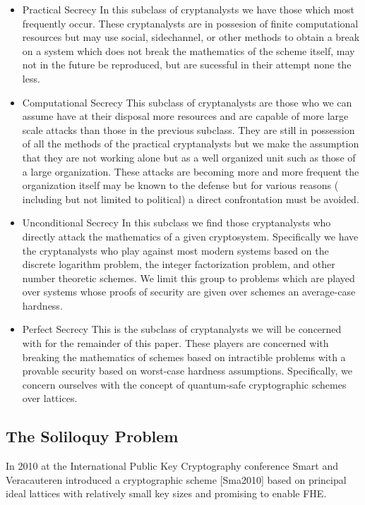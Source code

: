 \begin{itemize}
\item{Practical Secrecy} In this subclass of cryptanalysts we have those
which most frequently occur. These cryptanalysts are in possesion of
finite computational resources but may use social, sidechannel, or
other methods to obtain a break on a system which does not break the
mathematics of the scheme itself, may not in the future be reproduced,
but are sucessful in their attempt none the less.

\item{Computational Secrecy} This subclass of cryptanalysts are those who
we can assume have at their disposal more resources and are capable of
more large scale attacks than those in the previous subclass. They are
still in possession of all the methods of the practical cryptanalysts
but we make the assumption that they are not working alone but as a
well organized unit such as those of a large organization. These
attacks are becoming more and more frequent the organization itself may
be known to the defense but for various reasons ( including but not
limited to political) a direct confrontation must be avoided.

\item{Unconditional Secrecy} In this subclass we find those cryptanalysts
who directly attack the mathematics of a given cryptosystem.
Specifically we have the cryptanalysts who play against most modern
systems based on the discrete logarithm problem, the integer
factorization problem, and other number theoretic schemes. We limit
this group to problems which are played over systems whose proofs of
security are given over schemes an average-case hardness.

\item{Perfect Secrecy} This is the subclass of cryptanalysts we will be
concerned with for the remainder of this paper. These players are
concerned with breaking the mathematics of schemes based on intractible
problems with a provable security based on worst-case hardness
assumptions. Specifically, we concern ourselves with the concept of
quantum-safe cryptographic schemes over lattices.
\end{itemize}

\subsection{The Soliloquy Problem}

In 2010 at the International Public Key Cryptography conference Smart
and Veracauteren introduced a cryptographic scheme [Sma2010] based on
principal ideal lattices with relatively small key sizes and promising
to enable FHE.

